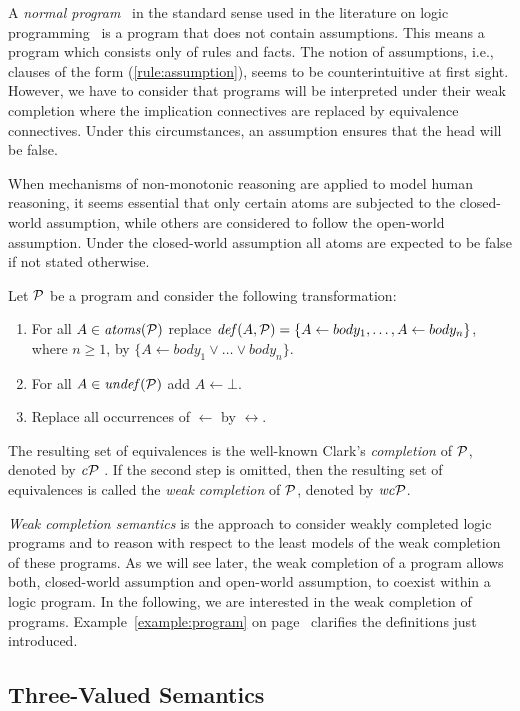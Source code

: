 A \textit{normal program} \textendash\ in the standard sense used in the literature on logic programming \textendash\ is a program that does not contain assumptions. This means a program which consists only of rules and facts. The notion of assumptions, i.e., clauses of the form (\ref{rule:assumption}), seems to be counterintuitive at first sight. However, we have to consider that programs will be interpreted under their weak completion where the implication connectives are replaced by equivalence connectives. Under this circumstances, an assumption ensures that the head will be false.

When mechanisms of non-monotonic reasoning are applied to model human reasoning, it seems essential that only certain atoms are subjected to the closed-world assumption, while others are considered to follow the open-world assumption. Under the closed-world assumption all atoms are expected to be false if not stated otherwise.

Let $\mathcal{P}$ be a program and consider the following transformation:
\begin{enumerate}
\item For all $A \in \mathit{atoms}(\mathcal{P})$ replace $\mathit{def}(A, \mathcal{P}) = \{A \leftarrow body_1, \dots, A \leftarrow body_n\}$, where $n \geq 1$, by $\{A \leftarrow body_1 \vee \dots \vee body_n\}$.
\item For all $A \in \mathit{undef}(\mathcal{P})$ add $A \leftarrow \bot$.
\item Replace all occurrences of $\leftarrow$ by $\leftrightarrow$.
\end{enumerate}
The resulting set of equivalences is the well-known Clark's \textit{completion} of $\mathcal{P}$, denoted by $\mathit{c}\mathcal{P}$ \cite{clark1978negation}. If the second step is omitted, then the resulting set of equivalences is called the \textit{weak completion} of $\mathcal{P}$, denoted by $\mathit{wc}\mathcal{P}$. 

\textit{Weak completion semantics} is the approach to consider weakly completed logic programs and to reason with respect to the least models of the weak completion of these programs. As we will see later, the weak completion of a program allows both, closed-world assumption and open-world assumption, to coexist within a logic program. In the following, we are interested in the weak completion of programs. Example~\ref{example:program} on page~\pageref{example:program} clarifies the definitions just introduced.

\subsection{Three-Valued Semantics}

